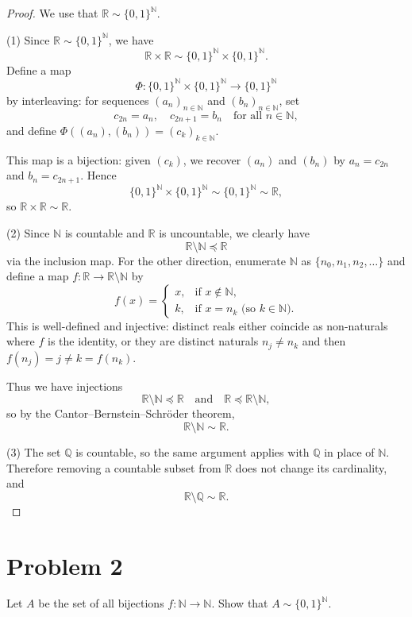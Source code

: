 \documentclass[answers,12pt,addpoints]{exam}
\begin{document}
\begin{proof}
We use that $\mathbb{R} \sim \{0,1\}^{\mathbb{N}}$.

\smallskip

(1) Since $\mathbb{R} \sim \{0,1\}^{\mathbb{N}}$, we have
\[
\mathbb{R} \times \mathbb{R}
\sim \{0,1\}^{\mathbb{N}} \times \{0,1\}^{\mathbb{N}}.
\]
Define a map
\[
\Phi : \{0,1\}^{\mathbb{N}} \times \{0,1\}^{\mathbb{N}} \to \{0,1\}^{\mathbb{N}}
\]
by interleaving: for sequences $(a_n)_{n \in \mathbb{N}}$ and $(b_n)_{n \in \mathbb{N}}$, set
\[
c_{2n} = a_n, \quad c_{2n+1} = b_n \quad\text{for all } n \in \mathbb{N},
\]
and define $\Phi((a_n),(b_n)) = (c_k)_{k \in \mathbb{N}}$.

This map is a bijection: given $(c_k)$, we recover $(a_n)$ and $(b_n)$ by
$a_n = c_{2n}$ and $b_n = c_{2n+1}$. Hence
\[
\{0,1\}^{\mathbb{N}} \times \{0,1\}^{\mathbb{N}} \sim \{0,1\}^{\mathbb{N}} \sim \mathbb{R},
\]
so $\mathbb{R} \times \mathbb{R} \sim \mathbb{R}$.

\smallskip

(2) Since $\mathbb{N}$ is countable and $\mathbb{R}$ is uncountable, we clearly have
\[
\mathbb{R} \setminus \mathbb{N} \preceq \mathbb{R}
\]
via the inclusion map. For the other direction, enumerate $\mathbb{N}$ as
$\{n_0,n_1,n_2,\dots\}$ and define a map $f : \mathbb{R} \to \mathbb{R} \setminus \mathbb{N}$ by
\[
f(x) =
\begin{cases}
x, & \text{if } x \notin \mathbb{N},\\[4pt]
k, & \text{if } x = n_k \text{ (so $k \in \mathbb{N}$)}.
\end{cases}
\]
This is well-defined and injective: distinct reals either coincide as non-naturals
where $f$ is the identity, or they are distinct naturals $n_j \neq n_k$ and then
$f(n_j) = j \neq k = f(n_k)$.

Thus we have injections
\[
\mathbb{R} \setminus \mathbb{N} \preceq \mathbb{R}
\quad\text{and}\quad
\mathbb{R} \preceq \mathbb{R} \setminus \mathbb{N},
\]
so by the Cantor--Bernstein--Schröder theorem,
\[
\mathbb{R} \setminus \mathbb{N} \sim \mathbb{R}.
\]

\smallskip

(3) The set $\mathbb{Q}$ is countable, so the same argument applies with
$\mathbb{Q}$ in place of $\mathbb{N}$. Therefore removing a countable subset
from $\mathbb{R}$ does not change its cardinality, and
\[
\mathbb{R} \setminus \mathbb{Q} \sim \mathbb{R}.
\]
\end{proof}

\section*{Problem 2}
Let $A$ be the set of all bijections $f : \mathbb{N} \to \mathbb{N}$. Show that
$A \sim \{0,1\}^{\mathbb{N}}$.
\end{document}

